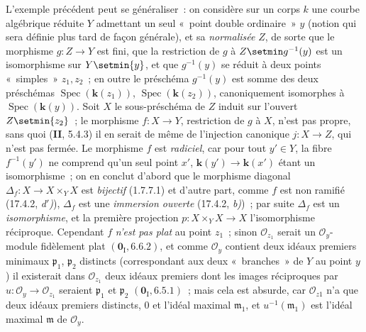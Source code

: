 \begin{env}[11.7.3]
\label{IV.11.7.3-fr}
L'exemple précédent peut se généraliser~: on considère sur un corps $k$ une
courbe algébrique réduite $Y$ admettant un seul «~point double ordinaire~» $y$
(notion qui sera définie plus tard de façon générale), et sa \emph{normalisée} $Z$, de
sorte que le morphisme $g:Z\to Y$ est fini, que la restriction de $g$ à
$Z\setmin g^{-1}(y)$ est un isomorphisme sur $Y\setmin\{y\}$, et que $g^{-1}(y)$ se réduit à
deux points «~simples~» $z_1,z_2$~; en outre le préschéma $g^{-1}(y)$ est somme
des deux préschémas $\operatorname{Spec}(\boldsymbol{k}(z_1))$,
$\operatorname{Spec}(\boldsymbol{k}(z_2))$, canoniquement isomorphes à
$\operatorname{Spec}(\boldsymbol{k}(y))$. Soit $X$ le sous-préschéma de $Z$ induit sur
l'ouvert $Z\setmin\{z_2\}$~; le morphisme $f:X\to Y$, restriction de $g$ à $X$, n'est
pas propre, sans quoi (\textbf{II}, 5.4.3) il en serait de même de l'injection
canonique $j:X\to Z$, qui n'est pas fermée. Le morphisme $f$ est \emph{radiciel}, car
pour tout $y'\in Y$, la fibre $f^{-1}(y')$ ne comprend qu'un seul point $x'$,
$\boldsymbol{k}(y')\to\boldsymbol{k}(x')$ étant un isomorphisme~; on en conclut d'abord que le morphisme
diagonal $\Delta_f:X\to X\times_Y X$ est \emph{bijectif} (1.7.7.1) et d'autre part,
comme $f$ est non ramifié (17.4.2, \emph{d$'$)}), $\Delta_f$ est une \emph{immersion ouverte}
(17.4.2, \emph{b)})~; par suite $\Delta_f$ est un \emph{isomorphisme}, et la première
projection $p:X\times_Y X\to X$ l'isomorphisme réciproque. Cependant $f$ \emph{n'est
pas plat} au point $z_1$~; sinon $\mathcal O_{z_1}$ serait un
$\mathcal O_y$-module fidèlement plat $(\mathbf 0_{\mathrm I},6.6.2)$, et comme
$\mathcal O_y$ contient deux idéaux premiers minimaux $\mathfrak p_1$,
$\mathfrak p_2$ distincts (correspondant aux deux «~branches~» de $Y$ au point
$y$) il existerait dans $\mathcal O_{z_1}$ deux idéaux premiers dont les images
réciproques par $u:\mathcal O_y\to\mathcal O_{z_1}$ seraient
$\mathfrak p_1$ et $\mathfrak p_2$ $(\mathbf 0_{\mathrm I},6.5.1)$~; mais cela
est absurde, car $\mathcal O_{z1}$ n'a que deux idéaux premiers distincts, $0$
et l'idéal maximal $\mathfrak m_1$, et $u^{-1}(\mathfrak m_1)$ est l'idéal
maximal $\mathfrak m$ de $\mathcal O_y$.
\end{env}

